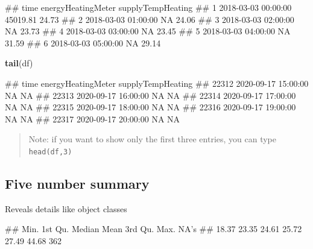 \documentclass[
]{book}
\newenvironment{Shaded}{\begin{snugshade}}{\end{snugshade}}
\newcommand{\KeywordTok}[1]{\textcolor[rgb]{0.13,0.29,0.53}{\textbf{#1}}}
\newcommand{\NormalTok}[1]{#1}
\newcommand{\OperatorTok}[1]{\textcolor[rgb]{0.81,0.36,0.00}{\textbf{#1}}}
\let\oldShaded\Shaded
\let\endoldShaded\endShaded
\renewenvironment{Shaded}{\footnotesize\oldShaded}{\endoldShaded}
\let\oldverbatim\verbatim
\let\endoldverbatim\endverbatim
\renewenvironment{verbatim}{\footnotesize\oldverbatim}{\endoldverbatim}
\begin{document}
\begin{verbatim}
##                  time energyHeatingMeter supplyTempHeating
## 1 2018-03-03 00:00:00           45019.81             24.73
## 2 2018-03-03 01:00:00                 NA             24.06
## 3 2018-03-03 02:00:00                 NA             23.73
## 4 2018-03-03 03:00:00                 NA             23.45
## 5 2018-03-03 04:00:00                 NA             31.59
## 6 2018-03-03 05:00:00                 NA             29.14
\end{verbatim}

\begin{Shaded}
\begin{Highlighting}[]
\KeywordTok{tail}\NormalTok{(df)}
\end{Highlighting}
\end{Shaded}

\begin{verbatim}
##                      time energyHeatingMeter supplyTempHeating
## 22312 2020-09-17 15:00:00                 NA                NA
## 22313 2020-09-17 16:00:00                 NA                NA
## 22314 2020-09-17 17:00:00                 NA                NA
## 22315 2020-09-17 18:00:00                 NA                NA
## 22316 2020-09-17 19:00:00                 NA                NA
## 22317 2020-09-17 20:00:00                 NA                NA
\end{verbatim}

\begin{quote}
Note: if you want to show only the first three entries, you can type \texttt{head(df,3)}
\end{quote}

\hypertarget{five-number-summary}{%
\subsection{Five number summary}\label{five-number-summary}}

Reveals details like object classes

\begin{Shaded}
\end{Shaded}

\begin{verbatim}
##    Min. 1st Qu.  Median    Mean 3rd Qu.    Max.    NA's 
##   18.37   23.35   24.61   25.72   27.49   44.68     362
\end{verbatim}
\end{document}
